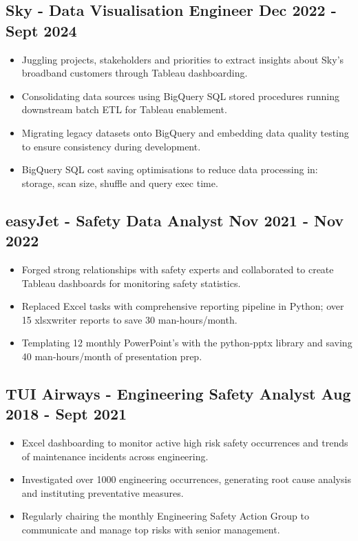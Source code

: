 \documentclass[a4paper,9pt]{article}
\begin{document}
\subsection*{\textbf{Sky - Data Visualisation Engineer} \hfill  Dec 2022 - Sept 2024}
\begin{itemize}[noitemsep]
    \item Juggling projects, stakeholders and priorities to extract insights about Sky's broadband customers through Tableau dashboarding.
    \item Consolidating data sources using BigQuery SQL stored procedures running downstream batch ETL for Tableau enablement.
    \item Migrating legacy datasets onto BigQuery and embedding data quality testing to ensure consistency during development.
    \item BigQuery SQL cost saving optimisations to reduce data processing in: storage, scan size, shuffle and query exec time.
\end{itemize}

\subsection*{\textbf{easyJet - Safety Data Analyst} \hfill  Nov 2021 - Nov 2022}
\begin{itemize}[noitemsep]
    \item Forged strong relationships with safety experts and collaborated to create Tableau dashboards for monitoring safety statistics.
    \item Replaced Excel tasks with comprehensive reporting pipeline in Python; over 15 xlsxwriter reports to save 30 man-hours/month.
    \item Templating 12 monthly PowerPoint's with the python-pptx library and saving 40 man-hours/month of presentation prep.
\end{itemize}

\subsection*{\textbf{TUI Airways - Engineering Safety Analyst} \hfill  Aug 2018 - Sept 2021}
\begin{itemize}[noitemsep]
	\item Excel dashboarding to monitor active high risk safety occurrences and trends of maintenance incidents across engineering.
	\item Investigated over 1000 engineering occurrences, generating root cause analysis and instituting preventative measures.
    \item Regularly chairing the monthly Engineering Safety Action Group to communicate and manage top risks with senior management.
\end{itemize}
\end{document}
